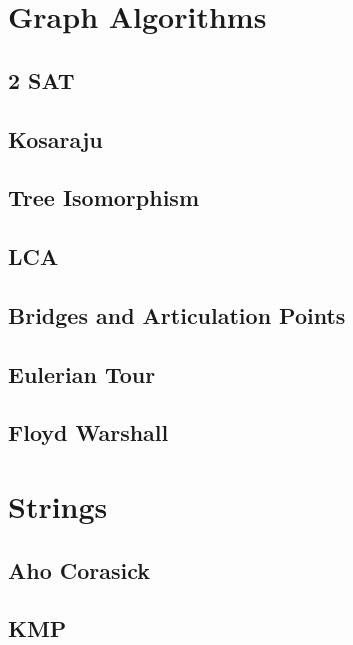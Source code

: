\section{Graph Algorithms}
\subsection{2 SAT}
\raggedbottom
\hrulefill
\subsection{Kosaraju}
\raggedbottom
\hrulefill
\subsection{Tree Isomorphism}
\raggedbottom
\hrulefill
\subsection{LCA}
\raggedbottom
\hrulefill
\subsection{Bridges and Articulation Points}
\raggedbottom
\hrulefill
\subsection{Eulerian Tour}
\raggedbottom
\hrulefill
\subsection{Floyd Warshall}
\raggedbottom
\hrulefill

\section{Strings}
\subsection{Aho Corasick}
\raggedbottom
\hrulefill
\subsection{KMP}
\raggedbottom
\hrulefill
